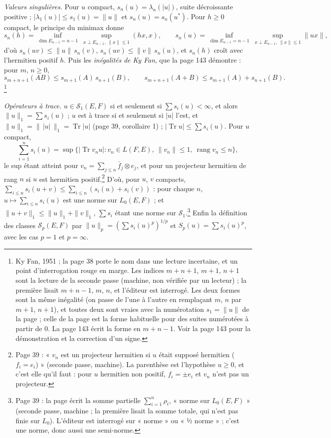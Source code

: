 \documentclass[11pt,a4paper]{article}
\begin{document}
\emph{Valeurs singulières.} Pour $u$ compact, $s_n(u) = \lambda_n(|u|)$, suite
décroissante positive ; $|\lambda_1(u)| \leq s_1(u) = \|u\|$ et $s_n(u) =
s_n(u^{*})$. Pour $h \geq 0$ compact, le principe du minimax donne
\[
  s_n(h) = \inf_{\dim E_{n-1} = n-1}\ \sup_{x \perp E_{n-1},\ \|x\| \leq 1} (hx, x),
  \qquad
  s_n(u) = \inf_{\dim E_{n-1} = n-1}\ \sup_{x \perp E_{n-1},\ \|x\| \leq 1} \|ux\|,
\]
d'où $s_n(uv) \leq \|u\|\,s_n(v)$, $s_n(uv) \leq \|v\|\,s_n(u)$, et $s_n(h)$
croît avec l'hermitien positif $h$. Puis les \emph{inégalités de Ky Fan},
que la page 143 démontre : pour $m$, $n \geq 0$,
\[
  s_{m+n+1}(AB) \leq s_{m+1}(A)\,s_{n+1}(B), \qquad
  s_{m+n+1}(A+B) \leq s_{m+1}(A) + s_{n+1}(B) .
\]
\footnote{Ky Fan, 1951 ; la page 38 porte le nom dans une lecture incertaine,
et un point d'interrogation rouge en marge. Les indices $m+n+1$, $m+1$,
$n+1$ sont la lecture de la seconde passe (machine, non vérifiée par un
lecteur) ; la première lisait $m+n-1$, $m$, $n$, et l'éditeur est interrogé.
Les deux formes sont la même inégalité (on passe de l'une à l'autre en
remplaçant $m$, $n$ par $m+1$, $n+1$), et toutes deux sont vraies avec la
numérotation $s_1 = \|u\|$ de la page ; celle de la page est la forme
habituelle pour des suites numérotées à partir de $0$. La page 143 écrit la
forme en $m+n-1$. Voir la page 143 pour la démonstration et la correction
d'un signe.}

\emph{Opérateurs à trace.} $u \in \mathcal{S}_1(E,F)$ si et seulement si
$\sum s_i(u) < \infty$, et alors $\|u\|_1 = \sum s_i(u)$ ; $u$ est à trace si
et seulement si $|u|$ l'est, et $\|u\|_1 = \|\,|u|\,\|_1 =
\operatorname{Tr}|u|$ (page 39, corollaire 1) ;
$|\operatorname{Tr} u| \leq \sum s_i(u)$. Pour $u$ compact,
\[
  \sum_{i=1}^n s_i(u) = \sup\bigl\{ |\operatorname{Tr} v_n u| : v_n \in L(F,E),\   \|v_n\| \leq 1,\ \operatorname{rang} v_n \leq n \bigr\},
\]
le sup étant atteint pour $v_n = \sum_{j \leq n} \bar{f}_j \otimes e_j$, et
pour un projecteur hermitien de rang $n$ si $u$ est hermitien positif.\footnote{Page
39 : « $v_n$ est un projecteur hermitien si $u$ était supposé hermitien
($f_i = e_i$) » (seconde passe, machine). La parenthèse est l'hypothèse $u
\geq 0$, et c'est elle qu'il faut : pour $u$ hermitien non positif, $f_i =
\pm e_i$ et $v_n$ n'est pas un projecteur.} D'où, pour $u$, $v$ compacts,
$\sum_{i \leq n} s_i(u+v) \leq \sum_{i \leq n} (s_i(u) + s_i(v))$ : pour
chaque $n$, $u \mapsto \sum_{i \leq n} s_i(u)$ est une norme sur
$L_0(E,F)$ ; et $\|u+v\|_1 \leq \|u\|_1 + \|v\|_1$, $\sum s_i$ étant une
norme sur $\mathcal{S}_1$.\footnote{Page 39 : la page écrit la somme
partielle $\sum_{i=1}^{n} \rho_i$, « norme sur $L_0(E,F)$ » (seconde passe,
machine ; la première lisait la somme totale, qui n'est pas finie sur
$L_0$). L'éditeur est interrogé sur « norme » ou « ½ norme » ; c'est une
norme, donc aussi une semi-norme.} Enfin la définition des classes $\mathcal{S}_p(E,F)$
par $\|u\|_p = (\sum s_i(u)^p)^{1/p}$ et $S_p(u) = \sum s_i(u)^p$, avec les
cas $p = 1$ et $p = \infty$.
\end{document}
